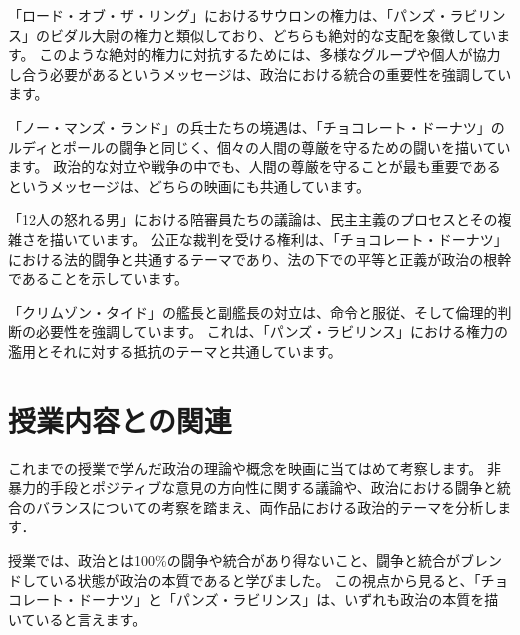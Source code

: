 \documentclass[titlepage,a4paper]{jsarticle}
\begin{document}


「ロード・オブ・ザ・リング」におけるサウロンの権力は、「パンズ・ラビリンス」のビダル大尉の権力と類似しており、どちらも絶対的な支配を象徴しています。
このような絶対的権力に対抗するためには、多様なグループや個人が協力し合う必要があるというメッセージは、政治における統合の重要性を強調しています。

「ノー・マンズ・ランド」の兵士たちの境遇は、「チョコレート・ドーナツ」のルディとポールの闘争と同じく、個々の人間の尊厳を守るための闘いを描いています。
政治的な対立や戦争の中でも、人間の尊厳を守ることが最も重要であるというメッセージは、どちらの映画にも共通しています。

「12人の怒れる男」における陪審員たちの議論は、民主主義のプロセスとその複雑さを描いています。
公正な裁判を受ける権利は、「チョコレート・ドーナツ」における法的闘争と共通するテーマであり、法の下での平等と正義が政治の根幹であることを示しています。

「クリムゾン・タイド」の艦長と副艦長の対立は、命令と服従、そして倫理的判断の必要性を強調しています。
これは、「パンズ・ラビリンス」における権力の濫用とそれに対する抵抗のテーマと共通しています。
\section{授業内容との関連}
これまでの授業で学んだ政治の理論や概念を映画に当てはめて考察します。
非暴力的手段とポジティブな意見の方向性に関する議論や、政治における闘争と統合のバランスについての考察を踏まえ、両作品における政治的テーマを分析します．

授業では、政治とは100\%の闘争や統合があり得ないこと、闘争と統合がブレンドしている状態が政治の本質であると学びました。
この視点から見ると、「チョコレート・ドーナツ」と「パンズ・ラビリンス」は、いずれも政治の本質を描いていると言えます。
\end{document}
